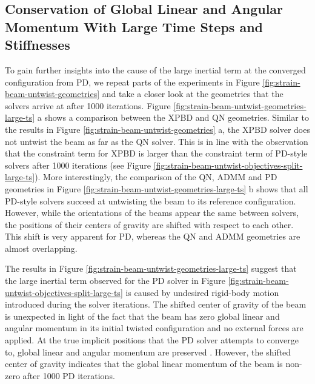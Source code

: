 \subsection{Conservation of Global Linear and Angular Momentum With Large Time Steps and Stiffnesses}\label{ss:momenta-large-ts}
To gain further insights into the cause of the large inertial term at the converged configuration from PD, we repeat parts of the 
experiments in Figure \ref{fig:strain-beam-untwist-geometries} and take a closer look at the geometries that the solvers arrive at after 1000 
iterations. Figure \ref{fig:strain-beam-untwist-geometries-large-ts} a shows a comparison between the XPBD and QN geometries. Similar to the 
results in Figure \ref{fig:strain-beam-untwist-geometries} a, the XPBD solver does not untwist the beam as far as the QN solver. This is in 
line with the observation that the constraint term for XPBD is larger than the constraint term of PD-style solvers after 1000 iterations (see 
Figure \ref{fig:strain-beam-untwist-objectives-split-large-ts}). More interestingly, the comparison of the QN, ADMM and PD geometries in 
Figure \ref{fig:strain-beam-untwist-geometries-large-ts} b shows that all PD-style solvers succeed at untwisting the beam to its reference 
configuration. However, while the orientations of the beams appear the same between solvers, the positions of their centers of gravity 
are shifted with respect to each other. This shift is very apparent for PD, whereas the QN and ADMM geometries are almost overlapping.

The results in Figure \ref{fig:strain-beam-untwist-geometries-large-ts} suggest that the large inertial term observed for the PD solver in 
Figure \ref{fig:strain-beam-untwist-objectives-split-large-ts} is caused by undesired rigid-body motion introduced during the solver iterations. 
The shifted center of gravity of the beam is unexpected in light of the fact that the beam has zero global linear and angular momentum in 
its initial twisted configuration and no external forces are applied. At the true implicit positions that the PD solver attempts to converge to, global 
linear and angular momentum are preserved \cite{bouaziz2014}. However, the shifted center of gravity indicates that the global linear 
momentum of the beam is non-zero after 1000 PD iterations.

